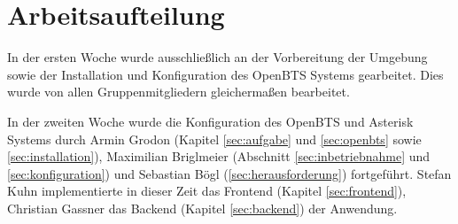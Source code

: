 \section{Arbeitsaufteilung}
In der ersten Woche wurde ausschließlich an der Vorbereitung der Umgebung sowie der Installation und Konfiguration des OpenBTS Systems gearbeitet. Dies wurde von allen Gruppenmitgliedern gleichermaßen bearbeitet.

In der zweiten Woche wurde die Konfiguration des OpenBTS und Asterisk Systems durch Armin Grodon (Kapitel \ref{sec:aufgabe} und \ref{sec:openbts} sowie \autoref{sec:installation}), 
Maximilian Briglmeier (Abschnitt \ref{sec:inbetriebnahme} und \ref{sec:konfiguration})
und Sebastian Bögl (\autoref{sec:herausforderung}) fortgeführt. 
Stefan Kuhn implementierte in dieser Zeit das Frontend (Kapitel \ref{sec:frontend}), 
Christian Gassner das Backend (Kapitel \ref{sec:backend}) der Anwendung.